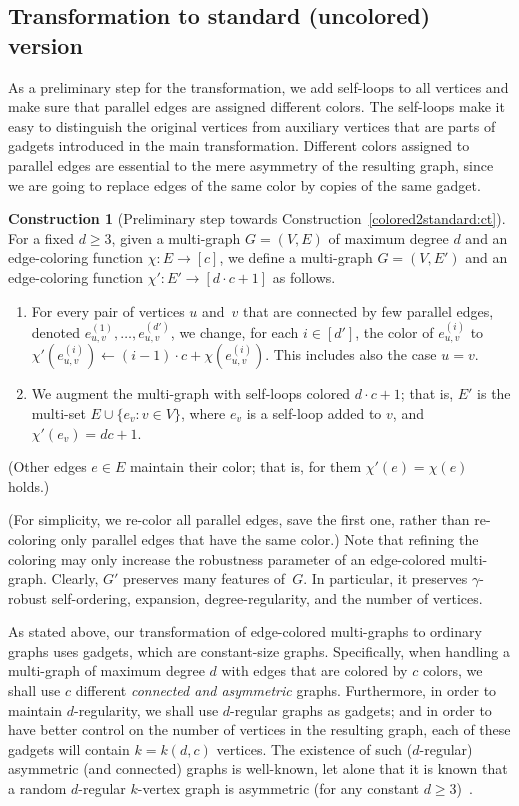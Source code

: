 \documentclass[10pt,a4paper]{article}
\theoremstyle{definition}
\newtheorem{construction}[theorem]{Construction}
\newcommand{\BCT}{\begin{construction}} \newcommand{\ECT}{\end{construction}}
\newcommand{\BE}{\begin{enumerate}}
\newcommand{\EE}{\end{enumerate}}
\begin{document}
\subsection{Transformation to standard (uncolored) version}
\label{edge-colored:trans:sec}
As a preliminary step for the transformation,
we add self-loops to all vertices
and make sure that parallel edges are assigned different colors.
The self-loops make it easy to distinguish
the original vertices from auxiliary vertices
that are parts of gadgets introduced in the main transformation.
Different colors assigned to parallel edges are essential
to the mere asymmetry of the resulting graph,
since we are going to replace edges of the same color
by copies of the same gadget.

\BCT[Preliminary step towards Construction~\ref{colored2standard:ct}]
\label{pre-colored2standard:ct}
For a fixed $d\geq3$,
given a multi-graph $G=(V,E)$ of maximum degree $d$
and an edge-coloring function $\chi\!:\!E\!\to\![c]$,
we define a multi-graph $G=(V,E')$ and
an edge-coloring function $\chi'\!:\!E'\!\to\![d\cdot c+1]$ as follows.
\BE
\item For every pair of vertices $u$ and~$v$ that are connected
by few parallel edges, denoted $e^{(1)}_{u,v},\ldots,e^{(d')}_{u,v}$,
we change, for each $i\in[d']$, the color of $e^{(i)}_{u,v}$
to $\chi'(e^{(i)}_{u,v})\gets(i-1)\cdot c+\chi(e^{(i)}_{u,v})$.
This includes also the case $u=v$.
\item We augment the multi-graph with self-loops colored $d\cdot c+1$;
that is, $E'$ is the multi-set $E\cup\{e_v:v\!\in\!V\}$,
where $e_v$ is a self-loop added to $v$, and $\chi'(e_v)=dc+1$.
\EE
{\rm(Other edges $e\!\in\!E$ maintain their color;
that is, for them $\chi'(e)=\chi(e)$ holds.)}
\ECT

(For simplicity, we re-color all parallel edges, save the first one,
rather than re-coloring only parallel edges that have the same color.)
Note that refining the coloring may only increase
the robustness parameter of an edge-colored multi-graph.
Clearly, $G'$ preserves many features of~$G$.
In particular, it preserves $\gamma$-robust self-ordering,
expansion, degree-regularity, and the number of vertices.

As stated above, our transformation of edge-colored multi-graphs
to ordinary graphs uses gadgets, which are constant-size graphs.
Specifically, when handling a multi-graph of maximum degree $d$
with edges that are colored by $c$ colors,
we shall use $c$ different {\em connected and asymmetric}\/ graphs.
Furthermore, in order to maintain $d$-regularity,
we shall use $d$-regular graphs as gadgets;
and in order to have better control on the number
of vertices in the resulting graph,
each of these gadgets will contain $k=k(d,c)$ vertices.
The existence of such ($d$-regular) asymmetric (and connected) graphs
is well-known, let alone that it is known that
a random $d$-regular $k$-vertex graph is asymmetric
(for any constant $d\geq3$)~\cite{B1,B2}.
\end{document}
